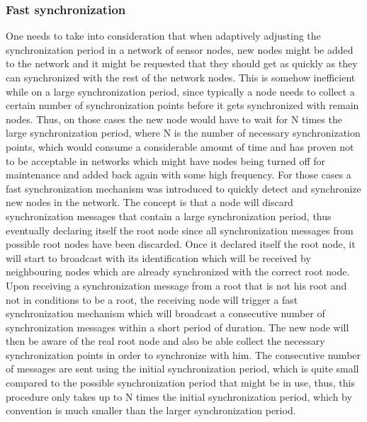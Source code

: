 \subsubsection{Fast synchronization}
One needs to take into consideration that when adaptively adjusting the synchronization period in a network of sensor nodes, new nodes might be added to the network and it might be requested that they should get as quickly as they can synchronized with the rest of the network nodes. This is somehow inefficient while on a large synchronization period, since typically a node needs to collect a certain number of synchronization points before it gets synchronized with remain nodes. Thus, on those cases the new node would have to wait for N times the large synchronization period, where N is the number of necessary synchronization points, which would consume a considerable amount of time and  has proven not to be acceptable in networks which might have nodes being turned off for maintenance and added back again with some high frequency. For those cases a fast synchronization mechanism was introduced to quickly detect and synchronize new nodes in the network. The concept is that a node will discard synchronization messages that contain a large synchronization period, thus eventually declaring itself the root node since all synchronization messages from possible root nodes have been discarded. Once it declared itself the root node, it will start to broadcast with its identification which will be received by neighbouring nodes which are already synchronized with the correct root node. Upon receiving a synchronization message from a root that is not his root and not in conditions to be a root, the receiving node will trigger a fast synchronization mechanism which will broadcast a consecutive number of synchronization messages within a short period of duration. The new node will then be aware of the real root node and also be able collect the necessary synchronization points in order to synchronize with him. The consecutive number of messages are sent using the initial synchronization period, which is quite small compared to the possible synchronization period that might be in use, thus, this procedure only takes up to N times the initial synchronization period, which by convention is much smaller than the larger synchronization period.\\

